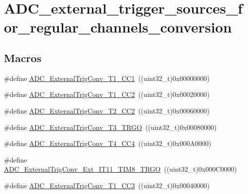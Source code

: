 \hypertarget{group___a_d_c__external__trigger__sources__for__regular__channels__conversion}{}\section{A\+D\+C\+\_\+external\+\_\+trigger\+\_\+sources\+\_\+for\+\_\+regular\+\_\+channels\+\_\+conversion}
\label{group___a_d_c__external__trigger__sources__for__regular__channels__conversion}
\subsection*{Macros}
\begin{DoxyCompactItemize}
\item 
\#define \mbox{\hyperlink{group___a_d_c__external__trigger__sources__for__regular__channels__conversion_ga303f24361ea930f8214e9e68b63b244e}{A\+D\+C\+\_\+\+External\+Trig\+Conv\+\_\+\+T1\+\_\+\+C\+C1}}~((uint32\+\_\+t)0x00000000)
\item 
\#define \mbox{\hyperlink{group___a_d_c__external__trigger__sources__for__regular__channels__conversion_ga8bf9fd9ad4e4c12ef41520ded2c3c332}{A\+D\+C\+\_\+\+External\+Trig\+Conv\+\_\+\+T1\+\_\+\+C\+C2}}~((uint32\+\_\+t)0x00020000)
\item 
\#define \mbox{\hyperlink{group___a_d_c__external__trigger__sources__for__regular__channels__conversion_gadfeb40c1735b0ee50f8a5aafdd840cc6}{A\+D\+C\+\_\+\+External\+Trig\+Conv\+\_\+\+T2\+\_\+\+C\+C2}}~((uint32\+\_\+t)0x00060000)
\item 
\#define \mbox{\hyperlink{group___a_d_c__external__trigger__sources__for__regular__channels__conversion_ga1cf4549534a00fe2f5527ad783204098}{A\+D\+C\+\_\+\+External\+Trig\+Conv\+\_\+\+T3\+\_\+\+T\+R\+GO}}~((uint32\+\_\+t)0x00080000)
\item 
\#define \mbox{\hyperlink{group___a_d_c__external__trigger__sources__for__regular__channels__conversion_ga8f6a764b7de878c2e09bbb0d1061d69c}{A\+D\+C\+\_\+\+External\+Trig\+Conv\+\_\+\+T4\+\_\+\+C\+C4}}~((uint32\+\_\+t)0x000\+A0000)
\item 
\#define \mbox{\hyperlink{group___a_d_c__external__trigger__sources__for__regular__channels__conversion_ga640de59aeac8cc3d96b6db3497975d02}{A\+D\+C\+\_\+\+External\+Trig\+Conv\+\_\+\+Ext\+\_\+\+I\+T11\+\_\+\+T\+I\+M8\+\_\+\+T\+R\+GO}}~((uint32\+\_\+t)0x000\+C0000)
\item 
\#define \mbox{\hyperlink{group___a_d_c__external__trigger__sources__for__regular__channels__conversion_ga41ad03e2921f6de0fb75ae06d6046e63}{A\+D\+C\+\_\+\+External\+Trig\+Conv\+\_\+\+T1\+\_\+\+C\+C3}}~((uint32\+\_\+t)0x00040000)

\end{DoxyCompactItemize}
